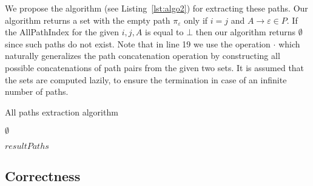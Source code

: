 We propose the algorithm (see Listing~\ref{lst:algo2}) for extracting these paths. Our algorithm returns a set with the empty path $\pi_{\varepsilon}$ only if $i = j$ and $A \to \varepsilon \in P$. If the AllPathIndex for the given $i,j,A$ is equal to $\bot$ then our algorithm returns $\emptyset$ since such paths do not exist. Note that in line 19 we use
the operation $\cdot$ which naturally generalizes the path concatenation operation
by constructing all possible concatenations of path pairs from the given two
sets. It is assumed that the sets are computed lazily, to ensure the termination in case of an infinite number of paths.

\begin{algorithm}
	\small
	\begin{algorithmic}[1]
		\caption{All paths extraction algorithm}
		\label{lst:algo2}		
		
		\State \Return $\emptyset$
		\EndIf
		
		
		  
		\EndIf
		\EndFor
		\EndIf
		\Else {}
		\EndIf
		\EndFor
		\EndIf
		\EndFor
		\State \Return $resultPaths$
		\EndFunction
	\end{algorithmic}
\end{algorithm}

\subsection{Correctness}

